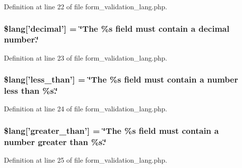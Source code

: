 Definition at line 22 of file form\-\_\-validation\-\_\-lang.\-php.

\hypertarget{form__validation__lang_8php_a1926dbdd7b5919a5e1a966d6ec18c9e4}{
\subsubsection[{\$lang}]{\setlength{\rightskip}{0pt plus 5cm}\$lang\mbox{[}'decimal'\mbox{]} = \char`\"{}The \%s field must contain {\bf a} decimal number.\char`\"{}}}\label{form__validation__lang_8php_a1926dbdd7b5919a5e1a966d6ec18c9e4}


Definition at line 23 of file form\-\_\-validation\-\_\-lang.\-php.

\hypertarget{form__validation__lang_8php_a6037a90e37e5d1bd139c641ae955f2b9}{
\subsubsection[{\$lang}]{\setlength{\rightskip}{0pt plus 5cm}\$lang\mbox{[}'less\-\_\-than'\mbox{]} = \char`\"{}The \%s field must contain {\bf a} number less than \%s.\char`\"{}}}\label{form__validation__lang_8php_a6037a90e37e5d1bd139c641ae955f2b9}


Definition at line 24 of file form\-\_\-validation\-\_\-lang.\-php.

\hypertarget{form__validation__lang_8php_a6e4bd5ad6a3238d9be1ca6f810eac978}{
\subsubsection[{\$lang}]{\setlength{\rightskip}{0pt plus 5cm}\$lang\mbox{[}'greater\-\_\-than'\mbox{]} = \char`\"{}The \%s field must contain {\bf a} number greater than \%s.\char`\"{}}}\label{form__validation__lang_8php_a6e4bd5ad6a3238d9be1ca6f810eac978}


Definition at line 25 of file form\-\_\-validation\-\_\-lang.\-php.


